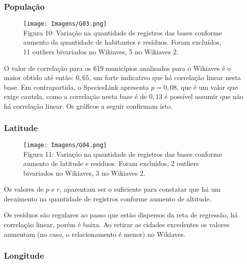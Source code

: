 \documentclass[12pt]{extarticle}
\newenvironment{resposta}{ \color{mygray}}{}
\begin{document}
\subsubsection{População}

\begin{figure}[h!]
\centering
\texttt{[image: Imagens/G03.png]}
\\{\scriptsize Figura 10: Variação na quantidade de registros das bases conforme aumento da quantidade de habitantes e resíduos. Foram excluídos, 11 outliers bivariados no Wikiaves, 5 no Wikiaves 2.}
\end{figure}

\begin{resposta}
 O valor de correlação para os 619 municípios analisados para o Wikiaves é o maior obtido até então: $0,65$, um forte indicativo que há correlação linear nesta base. Em contrapartida, o SpeciesLink apresenta $p = 0,08$, que é um valor que exige cautela, como a correlação nesta base é de $0,13$ é possível assumir que não há correlação linear. Os gráficos a seguir confirmam isto.
 
\end{resposta}

\subsubsection{Latitude}

\begin{figure}[h!]
\centering
\texttt{[image: Imagens/G04.png]}
\\{\scriptsize Figura 11: Variação na quantidade de registros das bases conforme aumento de latitude e resíduos. Foram excluídos, 2 outliers bivariados no Wikiaves, 3 no Wikiaves 2.}
\end{figure}

\newpage

\begin{resposta}
 Os valores de $p$ e $r$, aparentam ser o suficiente para constatar que há um decaimento na quantidade de registros conforme aumento de altitude. 
 
 Os resíduos são regulares ao passo que estão dispersos da reta de regressão, há correlação linear, porém é baixa. Ao retirar as cidades excedentes os valores aumentam (no caso, o relacionamento é menor) no Wikiaves.
\end{resposta}

\subsubsection{Longitude}
\end{document}
